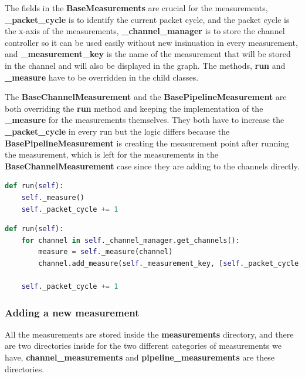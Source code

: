 The fields in the \textbf{BaseMeasurements} are crucial for the measurements, \textbf{\_packet\_cycle} is
to identify the current packet cycle, and the packet cycle is the x-axis of the measurements,
\textbf{\_channel\_manager} is to store the channel controller so it can be used easily without new insinuation
in every measurement, and \textbf{\_measurement\_key} is the name of the measurement that will be stored in the channel
and will also be displayed in the graph. The methods, \textbf{run} and \textbf{\_measure} have to 
be overridden in the child classes.

The \textbf{BaseChannelMeasurement} and the \textbf{BasePipelineMeasurement} are both overriding the 
\textbf{run} method and keeping the implementation of the \textbf{\_measure} for the measurements themselves. 
They both have to increase the \textbf{\_packet\_cycle} in every run but the logic differs because
the \textbf{BasePipelineMeasurement} is creating the measurement point after running the measurement, which
is left for the measurements in the \textbf{BaseChannelMeasurement} case since they are adding to the channels
directly.
\newline
\begin{lstlisting}[language=Python, caption={BaseChannelMeasurement's run method},captionpos=b]
def run(self):
	self._measure()
	self._packet_cycle += 1
\end{lstlisting}

\begin{lstlisting}[language=Python, caption={BasePipelineMeasurement's run method},captionpos=b]
def run(self):
	for channel in self._channel_manager.get_channels():
		measure = self._measure(channel)
		channel.add_measure(self._measurement_key, [self._packet_cycle, measure])

	self._packet_cycle += 1

\end{lstlisting}

\subsubsection{Adding a new measurement}
All the measurements are stored inside the \textbf{measurements} directory, and there are two directories
inside for the two different categories of measurements we have, \textbf{channel\_measurements} and 
\textbf{pipeline\_measurements} are these directories.

